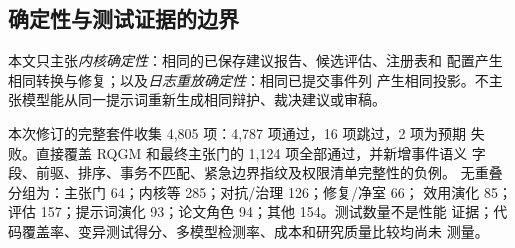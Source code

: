 \subsection{确定性与测试证据的边界}\label{sec:appendix:determinism}

本文只主张\emph{内核确定性}：相同的已保存建议报告、候选评估、注册表和
配置产生相同转换与修复；以及\emph{日志重放确定性}：相同已提交事件列
产生相同投影。不主张模型能从同一提示词重新生成相同辩护、裁决建议或审稿。

本次修订的完整套件收集 4,805 项：4,787 项通过，16 项跳过，2 项为预期
失败。直接覆盖 RQGM 和最终主张门的 1,124 项全部通过，并新增事件语义
字段、前驱、排序、事务不匹配、紧急边界指纹及权限清单完整性的负例。
无重叠分组为：主张门 64；内核等 285；对抗/治理 126；修复/净室 66；
效用演化 85；评估 157；提示词演化 93；论文角色 94；其他 154。测试数量不是性能
证据；代码覆盖率、变异测试得分、多模型检测率、成本和研究质量比较均尚未
测量。
